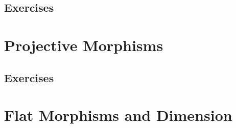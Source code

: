 \subsection{}
\subsection{}
\subsection{}
\subsection{Exercises}

\section{Projective Morphisms}

\subsection{}
\subsection{}
\subsection{}
\subsection{Exercises}

\section{Flat Morphisms and Dimension}

\subsection{}
\subsection{}
\subsection{}
\subsection{}
